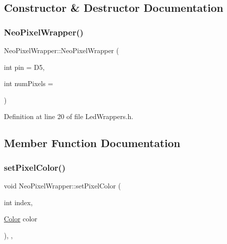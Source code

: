 \subsection{Constructor \& Destructor Documentation}
\mbox{\label{class_neo_pixel_wrapper_afc5c5949b137bc56535915717ece34a3}} 
\subsubsection{\texorpdfstring{Neo\+Pixel\+Wrapper()}{NeoPixelWrapper()}}
{\footnotesize\ttfamily Neo\+Pixel\+Wrapper\+::\+Neo\+Pixel\+Wrapper (\begin{DoxyParamCaption}\item[{int}]{pin = {\ttfamily D5},  }\item[{int}]{num\+Pixels = {} }\end{DoxyParamCaption})\hspace{0.3cm}{\ttfamily [inline]}}



Definition at line 20 of file Led\+Wrappers.\+h.



\subsection{Member Function Documentation}
\mbox{\label{class_neo_pixel_wrapper_a2dc988a9c17e27f36f83acb63e875c10}} 
\subsubsection{\texorpdfstring{set\+Pixel\+Color()}{setPixelColor()}}
{\footnotesize\ttfamily void Neo\+Pixel\+Wrapper\+::set\+Pixel\+Color (\begin{DoxyParamCaption}\item[{int}]{index,  }\item[{\hyperlink{struct_color}{Color}}]{color }\end{DoxyParamCaption})\hspace{0.3cm}{\ttfamily [inline]}, {\ttfamily [override]}, {\ttfamily [virtual]}}



